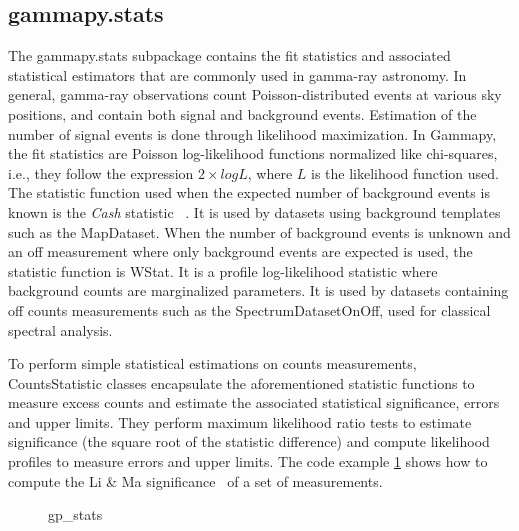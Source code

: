 \subsection{gammapy.stats}
\label{ssec:gammapy-stats}

The gammapy.stats subpackage contains the fit statistics and associated
statistical estimators that are commonly used in gamma-ray astronomy. In
general, gamma-ray observations count Poisson-distributed events at various sky
positions, and contain both signal and background events. Estimation of the
number of signal events is done through likelihood maximization. In Gammapy,
the fit statistics are Poisson log-likelihood functions normalized like
chi-squares, i.e., they follow the expression $2 \times log L$, where $L$ is
the likelihood function used. The statistic function used when the expected
number of background events is known is the \emph{Cash} statistic
~\citep{Cash}. It is used by datasets using background templates such as the
MapDataset. When the number of background events is unknown and an off
measurement where only background events are expected is used, the statistic
function is WStat. It is a profile log-likelihood statistic where background
counts are marginalized parameters. It is used by datasets containing off
counts measurements such as the SpectrumDatasetOnOff, used for classical
spectral analysis.

To perform simple statistical estimations on counts measurements,
CountsStatistic classes encapsulate the aforementioned statistic functions to
measure excess counts and estimate the associated statistical significance,
errors and upper limits. They perform maximum likelihood ratio tests to
estimate significance (the square root of the statistic difference) and compute
likelihood profiles to measure errors and upper limits. The code example
\ref{codeexample:stats} shows how to compute the Li \& Ma
significance~\citep{LiMa} of a set of measurements.

\begin{figure}
	{gp_stats}
	\caption{}
	\label{codeexample:stats} \end{figure}

